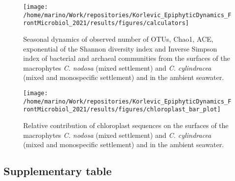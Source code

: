 \documentclass[
  12pt,
]{article}
\begin{document}
\begin{figure}[H]

{\centering \texttt{[image: /home/marino/Work/repositories/Korlevic\_EpiphyticDynamics\_FrontMicrobiol\_2021/results/figures/calculators]} 

}

\caption{Seasonal dynamics of observed number of OTUs, Chao1, ACE, exponential of the Shannon diversity index and Inverse Simpson index of bacterial and archaeal communities from the surfaces of the macrophytes \textit{C. nodosa} (mixed settlement) and \textit{C. cylindracea} (mixed and monospecific settlement) and in the ambient seawater.\label{calculators}}\label{fig:unnamed-chunk-2}
\end{figure}

\begin{figure}[H]

{\centering \texttt{[image: /home/marino/Work/repositories/Korlevic\_EpiphyticDynamics\_FrontMicrobiol\_2021/results/figures/chloroplast\_bar\_plot]} 

}

\caption{Relative contribution of chloroplast sequences on the surfaces of the macrophytes \textit{C. nodosa} (mixed settlement) and \textit{C. cylindracea} (mixed and monospecific settlement) and in the ambient seawater.\label{chloroplast}}\label{fig:unnamed-chunk-3}
\end{figure}

\hypertarget{supplementary-table}{%
\subsection{Supplementary table}\label{supplementary-table}}

\begingroup\fontsize{9}{11}\selectfont
\end{document}
